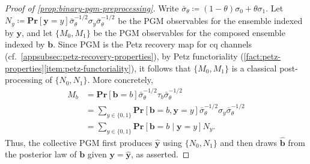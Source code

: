 \documentclass[11pt]{article}
\theoremstyle{remark}
\newcommand{\Prb}{\mathbf{Pr}}
\newcommand{\bits}{\{0,1\}}
\newcommand{\byhat}{\widehat{\mathbf{y}}}
\newcommand{\bbhat}{\widehat{\mathbf{b}}}
\newcommand{\bb}{\mathbf{b}}
\newcommand{\by}{\mathbf{y}}
\begin{document}
\begin{proof}[Proof of \cref{prop:binary-pgm-preprocessing}]
Write $\bar{\sigma}_\theta \coloneqq (1-\theta)\sigma_0 + \theta\sigma_1$. Let $N_y \coloneqq \Prb[\by = y]\bar{\sigma}_\theta^{-1/2}\sigma_y\bar{\sigma}_\theta^{-1/2}$ be the PGM observables for the ensemble indexed by $\by$, and let $\{M_0,M_1\}$ be the PGM observables for the composed ensemble indexed by $\bb$. Since PGM is the Petz recovery map for cq channels (cf.~\cref{appsubsec:petz-recovery-properties}), by Petz functoriality (\cref{fact:petz-properties}\ref{item:petz-functoriality}), it follows that $\{M_0,M_1\}$ is a classical post-processing of $\{N_0,N_1\}$. More concretely,
\begin{align*}
M_b
&= \Prb[\bb = b]\bar{\sigma}_\theta^{-1/2}\tau_b\bar{\sigma}_\theta^{-1/2} \\
&= \sum_{y \in \bits}{\Prb[\bb = b,\by = y]\bar{\sigma}_\theta^{-1/2}\sigma_y\bar{\sigma}_\theta^{-1/2}} \\
&= \sum_{y \in \bits}{\Prb[\bb = b \mid \by = y]N_y}.
\end{align*}
Thus, the collective PGM first produces $\byhat$ using $\{N_0,N_1\}$ and then draws $\bbhat$ from the posterior law of $\bb$ given $\by = \byhat$, as asserted.


\end{proof}
\end{document}
